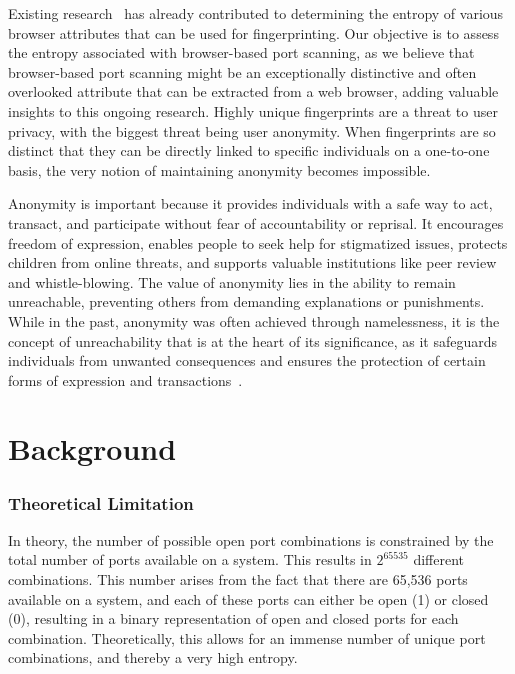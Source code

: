 Existing research~ has already contributed to determining the entropy of various browser attributes that can be used for fingerprinting. Our objective is to assess the entropy associated with browser-based port scanning, as we believe that browser-based port scanning might be an exceptionally distinctive and often overlooked attribute that can be extracted from a web browser, adding valuable insights to this ongoing research.
Highly unique fingerprints are a threat to user privacy, with the biggest threat being user anonymity. When fingerprints are so distinct that they can be directly linked to specific individuals on a one-to-one basis, the very notion of maintaining anonymity becomes impossible.

Anonymity is important because it provides individuals with a safe way to act, transact, and participate without fear of accountability or reprisal. It encourages freedom of expression, enables people to seek help for stigmatized issues, protects children from online threats, and supports valuable institutions like peer review and whistle-blowing. 
The value of anonymity lies in the ability to remain unreachable, preventing others from demanding explanations or punishments. While in the past, anonymity was often achieved through namelessness, it is the concept of unreachability that is at the heart of its significance, as it safeguards individuals from unwanted consequences and ensures the protection of certain forms of expression and transactions~.

\section{Background}

\subsubsection{Theoretical Limitation}

In theory, the number of possible open port combinations is constrained by the total number of ports available on a system. This results in $2^{65535}$ different combinations.
This number arises from the fact that there are 65,536 ports available on a system, and each of these ports can either be open (1) or closed (0), resulting in a binary representation of open and closed ports for each combination. 
Theoretically, this allows for an immense number of unique port combinations, and thereby a very high entropy.


